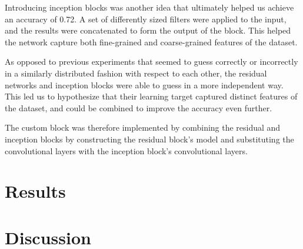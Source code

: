 \documentclass[11pt]{article}
\begin{document}
\begin{multicols}{2}
      Introducing inception blocks was another idea that ultimately helped us
      achieve an accuracy of 0.72. A set of differently sized filters were
      applied to the input, and the results were concatenated to form the
      output of the block. This helped the network capture both fine-grained
      and coarse-grained features of the dataset.

      As opposed to previous experiments that seemed to guess correctly or
      incorrectly in a similarly distributed fashion with respect to each
      other, the residual networks and inception blocks were able to guess in a
      more independent way. This led us to hypothesize that their learning
      target captured distinct features of the dataset, and could be combined
      to improve the accuracy even further.

      The custom block was therefore implemented by combining the residual and
      inception blocks by constructing the residual block's model and
      substituting the convolutional layers with the inception block's
      convolutional layers.

      \section{Results}

      \section{Discussion}


\end{multicols}
\end{document}

